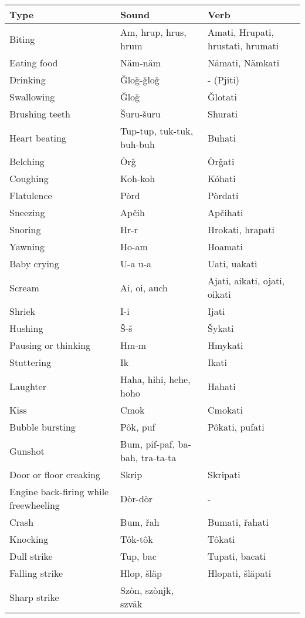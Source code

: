 \begin{longtable}{p{10em}p{5em}p{5em}}
		\textbf{Type} & \textbf{Sound} & \textbf{Verb} \\
		\endhead
		Biting & Am, hrup, hrus, hrum & Amati, Hrupati, hrustati, hrumati \\
		Eating food & Näm-näm & Nämati, Nämkati \\
		Drinking & Ǧloǧ-ǧloǧ & - (Pjiti) \\
		Swallowing & Ǧloǧ & Ǧlotati \\
		Brushing teeth & Šuru-šuru & Shurati \\
		Heart beating & Tup-tup, tuk-tuk, buh-buh & Buhati \\
		Belching & Òrǧ & Òrǧati \\
		Coughing & Koh-koh & Kóhati \\
		Flatulence & Pòrd & Pòrdati \\
		Sneezing & Apčih & Apčihati \\
		Snoring & Hr-r & Hrokati, hrapati \\
		Yawning & Ho-am & Hoamati \\
		Baby crying & U-a u-a & Uati, uakati \\
		Scream & Ai, oi, auch & Ajati, aikati, ojati, oikati \\
		Shriek & I-i & Ijati \\
		Hushing & Š-š & Šykati \\
		Pausing or thinking & Hm-m & Hmykati \\
		Stuttering & Ik & Ikati \\
		Laughter & Haha, hihi, hehe, hoho & Hahati \\
		Kiss & Cmok & Cmokati \\
		Bubble bursting & Pôk, puf & Pôkati, pufati \\
		Gunshot & Bum, pif-paf, ba-bah, tra-ta-ta & \\
		Door or floor creaking & Skrip & Skripati \\
		Engine back-firing while freewheeling & Dòr-dòr & - \\
		Crash & Bum, řah & Bumati, řahati \\
		Knocking & Tôk-tôk & Tôkati \\ 
		Dull strike & Tup, bac & Tupati, bacati \\
		Falling strike & Hlop, šläp & Hlopati, šläpati \\
		Sharp strike & Szòn, szònjk, szväk & \\

\end{longtable}
